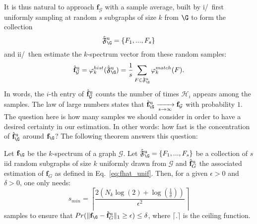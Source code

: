 It is thus natural to approach $\mathbf{f}_\mathcal{G}$ with a sample average, built by i/~first uniformly sampling at random $s$ subgraphs of size $k$ from $\G$ to form the collection 
$$\hat{\mathfrak{F}}^{\rm u}_\G=\{F_1,...,F_s\}$$
and ii/~then estimate the $k$-spectrum vector from these random samples:
\begin{align}
	\label{eq:fhat_unif}
	\hat{\mathbf{f}}_\mathcal{G}^{\rm u} = \varphi_k^{hist}(\hat{\mathfrak{F}}^{\rm u}_\G)= \frac{1}{s}\sum_{F\in\hat{\mathfrak{F}}^{\rm u}_\G} \varphi^{match}_k(F).
\end{align}
In words, the $i$-th entry of $\hat{\mathbf{f}}^{\rm u}_\mathcal{G}$ counts the number of times $\mathcal{H}_i$ appears among the samples. 
The law of large numbers states that $\hat{\mathbf{f}}^{\rm u}_\G \xrightarrow[s \to \infty]{} \mathbf{f}_\mathcal{G}$ with probability $1$.
The question here is how many samples we should consider in order to have a desired certainty in our estimation. In other words: how fast is the concentration of $\hat{\mathbf{f}}^{\rm u}_\G$ around $\mathbf{f}_\G$? The following theorem answers this question:%
\begin{theorem}
	\label{thm:norm1}
	Let $\mathbf{f}_\G$ be the $k$-spectrum of a graph $\mathcal{G}$. Let $\hat{\mathfrak{F}}^{\rm u}_\G=\{F_1,...,F_{s}\}$ be a collection of $s$ iid random subgraphs of size $k$ uniformly drawn from $\mathcal{G}$ and $\hat{\mathbf{f}}^{\rm u}_G$ the associated estimation of $\mathbf{f}_G$ as defined in Eq.~\eqref{eq:fhat_unif}. Then, for a given $\epsilon>0$ and $\delta >0$, one only needs:
	\begin{equation}
	s_{min}=\left \lceil \frac{2(N_k\log(2)+\log(\frac{1}{\delta} ))}{\epsilon^2} \right \rceil
	\end{equation}
	samples to ensure that $Pr(\| \mathbf{f}_\G-\hat{\mathbf{f}}^{\rm u}_G \|_1 \geq \epsilon )\leq\delta$, where $\lceil.\rceil$ is the ceiling function.
\end{theorem}

